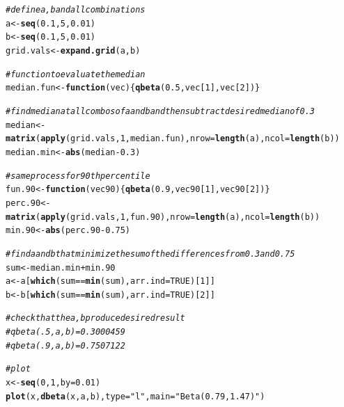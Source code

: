 \documentclass[12pt]{article}\usepackage[]{graphicx}\usepackage[]{color}
\makeatletter
\newcommand{\hlnum}[1]{\textcolor[rgb]{0.686,0.059,0.569}{#1}}%
\newcommand{\hlstr}[1]{\textcolor[rgb]{0.192,0.494,0.8}{#1}}%
\newcommand{\hlcom}[1]{\textcolor[rgb]{0.678,0.584,0.686}{\textit{#1}}}%
\newcommand{\hlopt}[1]{\textcolor[rgb]{0,0,0}{#1}}%
\newcommand{\hlstd}[1]{\textcolor[rgb]{0.345,0.345,0.345}{#1}}%
\newcommand{\hlkwa}[1]{\textcolor[rgb]{0.161,0.373,0.58}{\textbf{#1}}}%
\newcommand{\hlkwb}[1]{\textcolor[rgb]{0.69,0.353,0.396}{#1}}%
\newcommand{\hlkwc}[1]{\textcolor[rgb]{0.333,0.667,0.333}{#1}}%
\newcommand{\hlkwd}[1]{\textcolor[rgb]{0.737,0.353,0.396}{\textbf{#1}}}%
\newenvironment{kframe}{%
 \def\at@end@of@kframe{}%
 \ifinner\ifhmode%
  \def\at@end@of@kframe{\end{minipage}}%
  \begin{minipage}{\columnwidth}%
 \fi\fi%
 \def\FrameCommand##1{\hskip\@totalleftmargin \hskip-\fboxsep
 \colorbox{shadecolor}{##1}\hskip-\fboxsep
     \hskip-\linewidth \hskip-\@totalleftmargin \hskip\columnwidth}%
 \MakeFramed {\advance\hsize-\width
   \@totalleftmargin\z@ \linewidth\hsize
   \@setminipage}}%
 {\par\unskip\endMakeFramed%
 \at@end@of@kframe}
\newenvironment{knitrout}{}{} %
\makeatother
\begin{document}
\begin{knitrout}\footnotesize
{}\color{fgcolor}\begin{kframe}
\begin{alltt}
\hlcom{#define a, b and all combinations}
\hlstd{a} \hlkwb{<-} \hlkwd{seq}\hlstd{(}\hlnum{0.1}\hlstd{,}\hlnum{5}\hlstd{,}\hlnum{0.01}\hlstd{)}
\hlstd{b} \hlkwb{<-} \hlkwd{seq}\hlstd{(}\hlnum{0.1}\hlstd{,}\hlnum{5}\hlstd{,}\hlnum{0.01}\hlstd{)}
\hlstd{grid.vals} \hlkwb{<-} \hlkwd{expand.grid}\hlstd{(a, b)}

\hlcom{#function to evaluate the median}
\hlstd{median.fun} \hlkwb{<-} \hlkwa{function}\hlstd{(}\hlkwc{vec}\hlstd{) \{}\hlkwd{qbeta}\hlstd{(}\hlnum{0.5}\hlstd{, vec[}\hlnum{1}\hlstd{], vec[}\hlnum{2}\hlstd{])\}}

\hlcom{#find median at all combos of a and b and then subtract desired median of 0.3}
\hlstd{median} \hlkwb{<-} \hlkwd{matrix}\hlstd{(}\hlkwd{apply}\hlstd{(grid.vals,}\hlnum{1}\hlstd{, median.fun),} \hlkwc{nrow}\hlstd{=}\hlkwd{length}\hlstd{(a),} \hlkwc{ncol}\hlstd{=}\hlkwd{length}\hlstd{(b))}
\hlstd{median.min} \hlkwb{<-} \hlkwd{abs}\hlstd{(median}\hlopt{-}\hlnum{0.3}\hlstd{)}

\hlcom{#same process for 90th percentile}
\hlstd{fun.90} \hlkwb{<-} \hlkwa{function}\hlstd{(}\hlkwc{vec90}\hlstd{) \{}\hlkwd{qbeta}\hlstd{(}\hlnum{0.9}\hlstd{, vec90[}\hlnum{1}\hlstd{], vec90[}\hlnum{2}\hlstd{])\}}
\hlstd{perc.90} \hlkwb{<-} \hlkwd{matrix}\hlstd{(}\hlkwd{apply}\hlstd{(grid.vals,}\hlnum{1}\hlstd{, fun.90),} \hlkwc{nrow}\hlstd{=}\hlkwd{length}\hlstd{(a),} \hlkwc{ncol}\hlstd{=}\hlkwd{length}\hlstd{(b))}
\hlstd{min.90} \hlkwb{<-} \hlkwd{abs}\hlstd{(perc.90}\hlopt{-}\hlnum{0.75}\hlstd{)}

\hlcom{#find a and b that minimize the sum of the differences from 0.3 and 0.75}
\hlstd{sum} \hlkwb{<-} \hlstd{median.min}\hlopt{+}\hlstd{min.90}
\hlstd{a} \hlkwb{<-} \hlstd{a[}\hlkwd{which}\hlstd{(sum} \hlopt{==} \hlkwd{min}\hlstd{(sum),} \hlkwc{arr.ind} \hlstd{=} \hlnum{TRUE}\hlstd{)[}\hlnum{1}\hlstd{]]}
\hlstd{b} \hlkwb{<-} \hlstd{b[}\hlkwd{which}\hlstd{(sum} \hlopt{==} \hlkwd{min}\hlstd{(sum),} \hlkwc{arr.ind} \hlstd{=} \hlnum{TRUE}\hlstd{)[}\hlnum{2}\hlstd{]]}

\hlcom{#check that the a,b produce desired result}
\hlcom{#qbeta(.5, a, b) = 0.3000459}
\hlcom{#qbeta(.9, a, b) = 0.7507122}

\hlcom{#plot}
\hlstd{x} \hlkwb{<-} \hlkwd{seq}\hlstd{(}\hlnum{0}\hlstd{,} \hlnum{1}\hlstd{,} \hlkwc{by}\hlstd{=}\hlnum{0.01}\hlstd{)}
\hlkwd{plot}\hlstd{(x,} \hlkwd{dbeta}\hlstd{(x, a, b),} \hlkwc{type}\hlstd{=}\hlstr{"l"}\hlstd{,} \hlkwc{main}\hlstd{=}\hlstr{"Beta(0.79, 1.47)"}\hlstd{)}
\end{alltt}
\end{kframe}
\end{knitrout}
\end{document}
